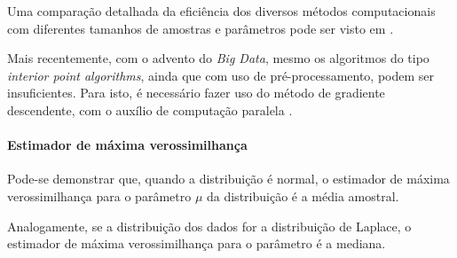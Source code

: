 \documentclass[a4paper, 12pt]{article}
\let\oldparagraph\paragraph
\renewcommand{\paragraph}[1]{\oldparagraph{#1}\mbox{}}
\begin{document}
Uma comparação detalhada da eficiência dos diversos métodos
computacionais com diferentes tamanhos de amostras e parâmetros pode ser
visto em \textcite{tortoise}.

Mais recentemente, com o advento do \emph{Big Data}, mesmo os algoritmos
do tipo \emph{interior point algorithms}, ainda que com uso de
pré-processamento, podem ser insuficientes. Para isto, é necessário
fazer uso do método de gradiente descendente, com o auxílio de
computação paralela \autocite[8]{qr}.

\hypertarget{estimador-de-maxima-verossimilhanca}{%
\paragraph{Estimador de máxima
verossimilhança}\label{estimador-de-maxima-verossimilhanca}}

Pode-se demonstrar que, quando a distribuição é normal, o estimador de
máxima verossimilhança para o parâmetro \(\mu\) da distribuição é a
média amostral.

Analogamente, se a distribuição dos dados for a distribuição de Laplace,
o estimador de máxima verossimilhança para o parâmetro é a mediana.
\end{document}
